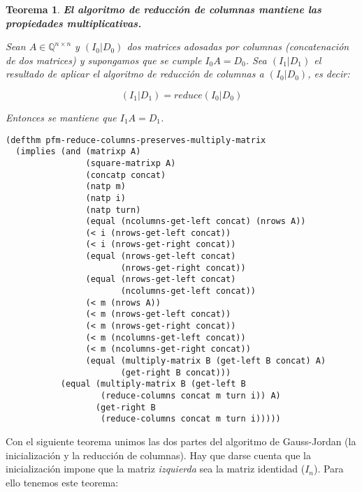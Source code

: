 \documentclass[a4paper,10pt]{article}
\newcommand{\M}[3]{#1 \in \mathbb{Q}^{#2 \times #3}}
\newtheorem{teor}{{Teorema}}
\begin{document}
\par \vspace{16pt}

\begin{teor} \textbf{El algoritmo de reducción de columnas mantiene las propiedades multiplicativas.}\vspace{8pt}\par
Sean $\M{A}{n}{n}$ y $(I_0|D_0)$ dos matrices adosadas por columnas (concatenación de dos matrices) y supongamos que se cumple $I_0A=D_0$. Sea $(I_1|D_1)$ el resultado de aplicar el algoritmo de reducción de columnas a $(I_0|D_0)$, es decir:

$$
(I_1|D_1) = reduce(I_0|D_0)
$$

\par \vspace{10pt}

Entonces se mantiene que $I_1A=D_1$.

\end{teor}

\begin{lstlisting}[language=clips]
(defthm pfm-reduce-columns-preserves-multiply-matrix
  (implies (and (matrixp A)
                (square-matrixp A)
                (concatp concat)
                (natp m)
                (natp i)
                (natp turn)
                (equal (ncolumns-get-left concat) (nrows A))
                (< i (nrows-get-left concat))
                (< i (nrows-get-right concat))
                (equal (nrows-get-left concat) 
                       (nrows-get-right concat))       
                (equal (nrows-get-left concat) 
                       (ncolumns-get-left concat))
                (< m (nrows A))
                (< m (nrows-get-left concat))
                (< m (nrows-get-right concat))
                (< m (ncolumns-get-left concat))
                (< m (ncolumns-get-right concat))
                (equal (multiply-matrix B (get-left B concat) A) 
                       (get-right B concat)))
           (equal (multiply-matrix B (get-left B 
                   (reduce-columns concat m turn i)) A)
                  (get-right B 
                   (reduce-columns concat m turn i)))))
\end{lstlisting}

\par \vspace{16pt}

Con el siguiente teorema unimos las dos partes del algoritmo de Gauss-Jordan (la inicialización y la reducción de columnas). Hay que darse cuenta que la inicialización impone que la matriz \emph{izquierda} sea la matriz identidad ($I_n$). Para ello tenemos este teorema:
\end{document}
